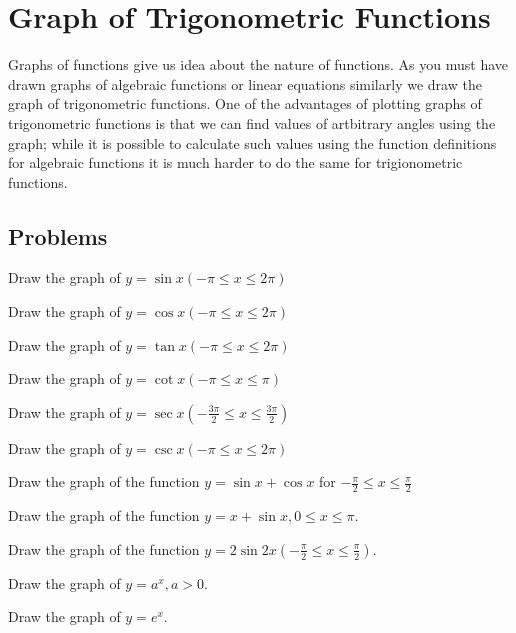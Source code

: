 \chapter{Graph of Trigonometric Functions}

Graphs of functions give us idea about the nature of functions. As you must have drawn graphs of algebraic
functions or linear equations similarly we draw the graph of trigonometric functions. One of the advantages
of plotting graphs of trigonometric functions is that we can find values of artbitrary angles using the
graph; while it is possible to calculate such values using the function definitions for algebraic functions
it is much harder to do the same for trigionometric functions.

\section{Problems}
\startitemize[n, 1*broad]
\item Draw the graph of $y = \sin x(-\pi\leq x\leq 2\pi)$

\item Draw the graph of $y = \cos x(-\pi\leq x\leq 2\pi)$

\item Draw the graph of $y = \tan x(-\pi\leq x\leq 2\pi)$

\item Draw the graph of $y = \cot x(-\pi\leq x\leq \pi)$

\item Draw the graph of $y = \sec x\left(-\frac{3\pi}{2}\leq x\leq \frac{3\pi}{2}\right)$

\item Draw the graph of $y = \csc x(-\pi\leq x\leq 2\pi)$

\item Draw the graph of the function $y = \sin x + \cos x$ for $-\frac{\pi}{2}\leq
   x\leq\frac{\pi}{2}$

\item Draw the graph of the function $y = x + \sin x, 0\leq x\leq \pi$.

\item Draw the graph of the function $y = 2\sin2x\left(-\frac{\pi}{2}\leq x\leq \frac{\pi}{2}\right)$.

\item Draw the graph of $y = a^x, a > 0$.

\item Draw the graph of $y = e^x$.

